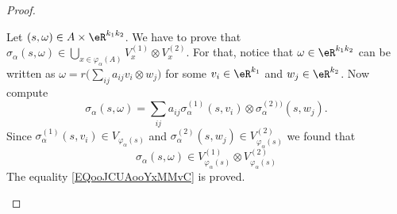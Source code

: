 \begin{proof}
\begin{subproof}
\begin{subproof}
\begin{subproof}
\begin{subequations}
				\end{subequations}
				Let \( (s,\omega)\in A\times \eR^{k_1k_2}\). We have to prove that \( \sigma_{\alpha}(s,\omega)\in \bigcup_{x\in \varphi_{\alpha}(A)}V_x^{(1)}\otimes V_x^{(2)}\). For that, notice that \( \omega\in \eR^{k_1k_2}\) can be written as \( \omega=r\big( \sum_{ij}a_{ij}v_i\otimes w_j \big)\) for some \( v_i\in \eR^{k_1}\) and \( w_j\in \eR^{k_2}\). Now compute
				\begin{equation}
					\sigma_{\alpha}(s,\omega)=\sum_{ij}a_{ij}\sigma_{\alpha}^{(1)}(s,v_i)\otimes \sigma_{\alpha}^{(2))}(s,w_j).
				\end{equation}
				Since \( \sigma_{\alpha}^{(1)}(s,v_i)\in V_{\varphi_{\alpha}(s)}\) and \( \sigma_{\alpha}^{(2)}(s,w_j)\in V_{\varphi_{\alpha}(s)}^{(2)}\) we found that
				\begin{equation}
					\sigma_{\alpha}(s,\omega)\in V_{\varphi_{\alpha}(s)}^{(1)}\otimes V_{\varphi_{\alpha}(s)}^{(2)}
				\end{equation}
				The equality \eqref{EQooJCUAooYxMMvC} is proved.
			\end{subproof}


\end{subproof}
\end{subproof}
\end{proof}
